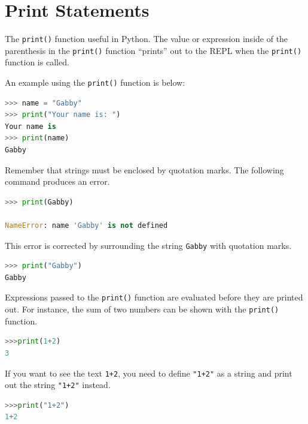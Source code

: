 \documentclass{book}
\begin{document}
    
        \section{Print Statements}\label{print-statements}
    




    
        The \lstinline!print()! function useful in Python. The value or
expression inside of the parenthesis in the \lstinline!print()! function
``prints'' out to the REPL when the \lstinline!print()! function is
called.

An example using the \lstinline!print()! function is below:

\begin{lstlisting}[language=Python]
>>> name = "Gabby"
>>> print("Your name is: ")
Your name is
>>> print(name)
Gabby
\end{lstlisting}

Remember that strings must be enclosed by quotation marks. The following
command produces an error.

\begin{lstlisting}[language=Python]
>>> print(Gabby)

NameError: name 'Gabby' is not defined
\end{lstlisting}

This error is corrected by surrounding the string \lstinline!Gabby! with
quotation marks.

\begin{lstlisting}[language=Python]
>>> print("Gabby")
Gabby
\end{lstlisting}
    




    
        Expressions passed to the \lstinline!print()! function are evaluated
before they are printed out. For instance, the sum of two numbers can be
shown with the \lstinline!print()! function.

\begin{lstlisting}[language=Python]
>>>print(1+2)
3
\end{lstlisting}

If you want to see the text \lstinline!1+2!, you need to define
\lstinline!"1+2"! as a string and print out the string \lstinline!"1+2"!
instead.

\begin{lstlisting}[language=Python]
>>>print("1+2")
1+2
\end{lstlisting}
    
\end{document}
